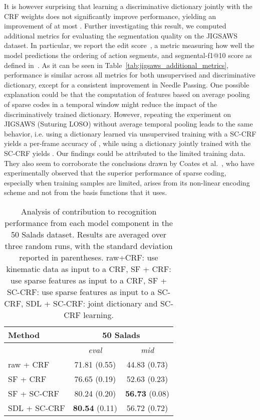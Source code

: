 \documentclass[10pt,twocolumn,letterpaper]{article}
\begin{document}
It is however surprising that learning a discriminative dictionary jointly with the CRF weights does not significantly improve performance, yielding an improvement of at most . Further investigating this result, we computed additional metrics for evaluating the segmentation quality on the JIGSAWS dataset. In particular, we report the edit score~\cite{Lea:ICRA16}, a metric measuring how well the model predictions the ordering of action segments, and segmental-f1@10 score as defined in~\cite{Lea:CVPR17}. As it can be seen in Table~\ref{tab:jigsaws_additional_metrics}, performance is similar across all metrics for both unsupervised and discriminative dictionary, except for a consistent improvement in Needle Passing. One possible explanation could be that the computation of features based on average pooling of sparse codes in a temporal window might reduce the impact of the discriminatively trained dictionary. However, repeating the experiment on JIGSAWS (Suturing LOSO) without average temporal pooling leads to the same behavior, i.e. using a dictionary learned via unsupervised training with a SC-CRF yields a per-frame accuracy of , while using a dictionary jointly trained with the SC-CRF yields . Our findings could be attributed to the limited training data. They also seem to corroborate the conclusions drawn by Coates et al.~\cite{Coates:ICML11-sparse}, who have experimentally observed that the superior performance of sparse coding, especially when training samples are limited, arises from its non-linear encoding scheme and not from the basis functions that it uses. 
\begin{table}[t]
\centering
\begin{tabular}{|@{\,}l@{\,}|@{\,}c@{\,}|@{\,}c@{\,}|}
\hline
Method & \multicolumn{2}{c|}{50 Salads} \\
\hline
 & \emph{eval} & \emph{mid} \\
\hline
raw + CRF & 71.81 (0.55) & 44.83 (0.73) \\
SF + CRF & 76.65 (0.19) & 52.63 (0.23)\\
SF + SC-CRF & 80.24 (0.20) & \textbf{56.73} (0.08)\\
SDL + SC-CRF & \textbf{80.54} (0.11) & 56.72 (0.72)\\
\hline 
\end{tabular}
\caption{Analysis of contribution to recognition performance from each
model component in the 50 Salads dataset. Results are averaged over three random runs, with the standard deviation reported in parentheses.  raw+CRF: use kinematic data as input to a CRF, SF + CRF: use sparse features  as input to a CRF, SF + SC-CRF: use sparse features  as input to a SC-CRF, SDL + SC-CRF: joint dictionary and SC-CRF learning.}
\vspace{-1.5em}
\label{tab:fiftysalads_ablation}
\end{table}
\end{document}
